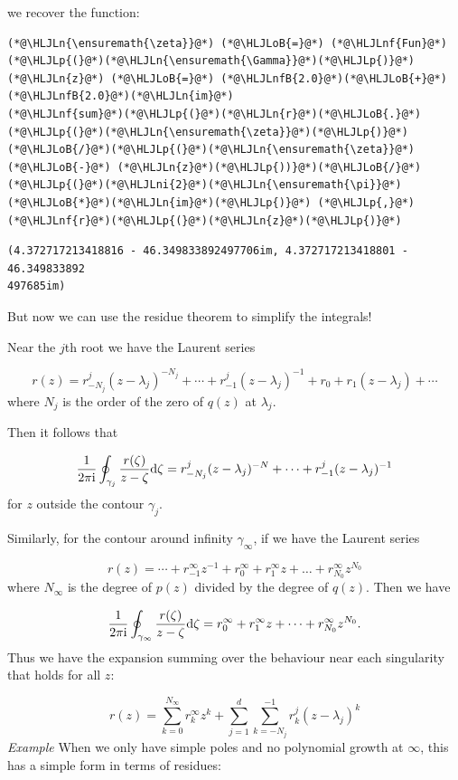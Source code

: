 \documentclass[12pt,a4paper]{article}
\newcommand{\HLJLn}[1]{#1}
\newcommand{\HLJLnf}[1]{\textcolor[RGB]{66,102,213}{#1}}
\newcommand{\HLJLnfB}[1]{\textcolor[RGB]{59,151,46}{#1}}
\newcommand{\HLJLni}[1]{\textcolor[RGB]{59,151,46}{#1}}
\newcommand{\HLJLoB}[1]{\textcolor[RGB]{102,102,102}{\textbf{#1}}}
\newcommand{\HLJLp}[1]{#1}
\def\D{ {\rm d} }
\def\I{ {\rm i} }
\begin{document}
we recover the function:


\begin{lstlisting}
(*@\HLJLn{\ensuremath{\zeta}}@*) (*@\HLJLoB{=}@*) (*@\HLJLnf{Fun}@*)(*@\HLJLp{(}@*)(*@\HLJLn{\ensuremath{\Gamma}}@*)(*@\HLJLp{)}@*)
(*@\HLJLn{z}@*) (*@\HLJLoB{=}@*) (*@\HLJLnfB{2.0}@*)(*@\HLJLoB{+}@*)(*@\HLJLnfB{2.0}@*)(*@\HLJLn{im}@*)
(*@\HLJLnf{sum}@*)(*@\HLJLp{(}@*)(*@\HLJLn{r}@*)(*@\HLJLoB{.}@*)(*@\HLJLp{(}@*)(*@\HLJLn{\ensuremath{\zeta}}@*)(*@\HLJLp{)}@*)(*@\HLJLoB{/}@*)(*@\HLJLp{(}@*)(*@\HLJLn{\ensuremath{\zeta}}@*) (*@\HLJLoB{-}@*) (*@\HLJLn{z}@*)(*@\HLJLp{))}@*)(*@\HLJLoB{/}@*)(*@\HLJLp{(}@*)(*@\HLJLni{2}@*)(*@\HLJLn{\ensuremath{\pi}}@*)(*@\HLJLoB{*}@*)(*@\HLJLn{im}@*)(*@\HLJLp{)}@*) (*@\HLJLp{,}@*) (*@\HLJLnf{r}@*)(*@\HLJLp{(}@*)(*@\HLJLn{z}@*)(*@\HLJLp{)}@*)
\end{lstlisting}

\begin{lstlisting}
(4.372717213418816 - 46.349833892497706im, 4.372717213418801 - 46.349833892
497685im)
\end{lstlisting}


But now we can use the residue theorem to simplify the integrals! 

Near the $j$th root we have the Laurent series

\[
r(z) = r_{-N_j}^j (z-\lambda_j)^{-N_j}  + \cdots + r_{-1}^j (z-\lambda_j)^{-1} + r_0 + r_1 (z-\lambda_j) + \cdots
\]
where $N_j$ is the order of the zero of $q(z)$ at $\lambda_j$.

Then it follows that

\[
{1 \over 2 \pi \I} \oint_{\gamma_j} {r(\zeta) \over z - \zeta} \D\zeta = 
r_{-N_j}^j (z-\lambda_j)^{-N}  + \cdots + r_{-1}^j (z-\lambda_j)^{-1}
\]
for $z$ outside the contour $\gamma_j$.

Similarly, for the contour around infinity $\gamma_\infty$, if we have the Laurent series

\[
r(z) = \cdots + r_{-1}^\infty z^{-1} + r_0^\infty  + r_1^\infty z + \dots + r_{N_0}^\infty z^{N_0}
\]
where $N_\infty$ is the degree of $p(z)$ divided by the degree of $q(z)$.  Then we have

\[
{1 \over 2 \pi \I} \oint_{\gamma_\infty} {r(\zeta) \over z - \zeta} \D\zeta = 
r_0^\infty + r_1^\infty z + \cdots +  r_{N_0}^\infty z^{N_0}.
\]
Thus we have the expansion summing over the behaviour near each singularity that holds for all $z$:

\[
r(z) = \sum_{k=0}^{N_\infty} r_k^\infty z^k  +  \sum_{j=1}^d \sum_{k = -N_j}^{-1} r_k^j (z - \lambda_j)^k
\]
\emph{Example} When we only have simple poles and no polynomial growth at $\infty$, this has a simple form in terms of residues:
\end{document}
